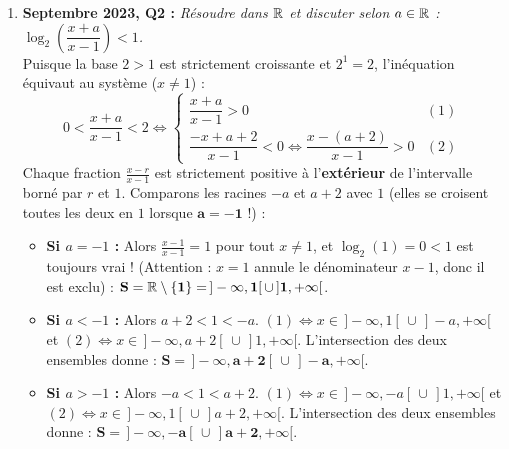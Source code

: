 \begin{exemple}
\begin{enumerate}
    \item \textbf{Septembre 2023, Q2 :} \emph{Résoudre dans $\mathbb{R}$ et discuter selon $a \in \mathbb{R}$ : $\log_2\left(\dfrac{x + a}{x - 1}\right) < 1$.}\\
    Puisque la base $2 > 1$ est strictement croissante et $2^1 = 2$, l'inéquation équivaut au système ($x \neq 1$) :
    \[
        0 < \frac{x + a}{x - 1} < 2 \iff \begin{cases} \dfrac{x + a}{x - 1} > 0 & (1) \\[1.8ex] \dfrac{-x + a + 2}{x - 1} < 0 \iff \dfrac{x - (a + 2)}{x - 1} > 0 & (2) \end{cases}
    \]
    Chaque fraction $\frac{x - r}{x - 1}$ est strictement positive à l'\textbf{extérieur} de l'intervalle borné par $r$ et $1$. Comparons les racines $-a$ et $a + 2$ avec $1$ (elles se croisent toutes les deux en $1$ lorsque $\mathbf{a = -1}$ !) :
    \begin{itemize}
        \item \textbf{Si $a = -1$ :} Alors $\frac{x - 1}{x - 1} = 1$ pour tout $x \neq 1$, et $\log_2(1) = 0 < 1$ est toujours vrai ! (Attention : $x = 1$ annule le dénominateur $x - 1$, donc il est exclu) : $\mathbf{S = \mathbb{R} \setminus \{1\} = \,]-\infty, 1[ \,\cup\, ]1, +\infty[}$.
        \item \textbf{Si $a < -1$ :} Alors $a + 2 < 1 < -a$.
        $(1) \iff x \in \,]-\infty, 1[ \,\cup\, ]-a, +\infty[$ et $(2) \iff x \in \,]-\infty, a + 2[ \,\cup\, ]1, +\infty[$.
        L'intersection des deux ensembles donne : $\mathbf{S = \,]-\infty, a + 2[ \,\cup\, ]-a, +\infty[}$.
        \item \textbf{Si $a > -1$ :} Alors $-a < 1 < a + 2$.
        $(1) \iff x \in \,]-\infty, -a[ \,\cup\, ]1, +\infty[$ et $(2) \iff x \in \,]-\infty, 1[ \,\cup\, ]a + 2, +\infty[$.
        L'intersection des deux ensembles donne : $\mathbf{S = \,]-\infty, -a[ \,\cup\, ]a + 2, +\infty[}$.
    \end{itemize}


\end{enumerate}
\end{exemple}
